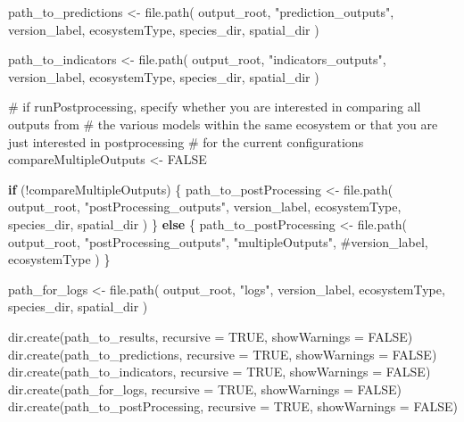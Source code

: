 \documentclass[
  letterpaper,
  DIV=11,
  numbers=noendperiod]{scrartcl}
\newenvironment{Shaded}{\begin{snugshade}}{\end{snugshade}}
\newcommand{\AttributeTok}[1]{\textcolor[rgb]{0.40,0.45,0.13}{#1}}
\newcommand{\CommentTok}[1]{\textcolor[rgb]{0.37,0.37,0.37}{#1}}
\newcommand{\ConstantTok}[1]{\textcolor[rgb]{0.56,0.35,0.01}{#1}}
\newcommand{\ControlFlowTok}[1]{\textcolor[rgb]{0.00,0.23,0.31}{\textbf{#1}}}
\newcommand{\FunctionTok}[1]{\textcolor[rgb]{0.28,0.35,0.67}{#1}}
\newcommand{\NormalTok}[1]{\textcolor[rgb]{0.00,0.23,0.31}{#1}}
\newcommand{\OtherTok}[1]{\textcolor[rgb]{0.00,0.23,0.31}{#1}}
\newcommand{\SpecialCharTok}[1]{\textcolor[rgb]{0.37,0.37,0.37}{#1}}
\newcommand{\StringTok}[1]{\textcolor[rgb]{0.13,0.47,0.30}{#1}}
\begin{document}
\begin{Shaded}
\begin{Highlighting}[]
\NormalTok{path\_to\_predictions }\OtherTok{\textless{}{-}} \FunctionTok{file.path}\NormalTok{(}
\NormalTok{  output\_root,}
  \StringTok{"prediction\_outputs"}\NormalTok{,}
\NormalTok{  version\_label,}
\NormalTok{  ecosystemType,}
\NormalTok{  species\_dir,}
\NormalTok{  spatial\_dir}
\NormalTok{)}

\NormalTok{path\_to\_indicators }\OtherTok{\textless{}{-}} \FunctionTok{file.path}\NormalTok{(}
\NormalTok{  output\_root,}
  \StringTok{"indicators\_outputs"}\NormalTok{,}
\NormalTok{  version\_label,}
\NormalTok{  ecosystemType,}
\NormalTok{  species\_dir,}
\NormalTok{  spatial\_dir}
\NormalTok{)}

\CommentTok{\# if runPostprocessing, specify whether you are interested in comparing all outputs from}
\CommentTok{\# the various models within the same ecosystem or that you are just interested in postprocessing}
\CommentTok{\# for the current configurations}
\NormalTok{compareMultipleOutputs }\OtherTok{\textless{}{-}} \ConstantTok{FALSE}

\ControlFlowTok{if}\NormalTok{ (}\SpecialCharTok{!}\NormalTok{compareMultipleOutputs) \{}
\NormalTok{  path\_to\_postProcessing }\OtherTok{\textless{}{-}} \FunctionTok{file.path}\NormalTok{(}
\NormalTok{    output\_root,}
    \StringTok{"postProcessing\_outputs"}\NormalTok{,}
\NormalTok{    version\_label,}
\NormalTok{    ecosystemType,}
\NormalTok{    species\_dir,}
\NormalTok{    spatial\_dir}
\NormalTok{  )}
\NormalTok{\} }\ControlFlowTok{else}\NormalTok{ \{}
\NormalTok{  path\_to\_postProcessing }\OtherTok{\textless{}{-}} \FunctionTok{file.path}\NormalTok{(}
\NormalTok{    output\_root,}
    \StringTok{"postProcessing\_outputs"}\NormalTok{,}
    \StringTok{"multipleOutputs"}\NormalTok{,}
    \CommentTok{\#version\_label,}
\NormalTok{    ecosystemType}
\NormalTok{  )}
\NormalTok{\}}

\NormalTok{path\_for\_logs }\OtherTok{\textless{}{-}} \FunctionTok{file.path}\NormalTok{(}
\NormalTok{  output\_root,}
  \StringTok{"logs"}\NormalTok{,}
\NormalTok{  version\_label,}
\NormalTok{  ecosystemType,}
\NormalTok{  species\_dir,}
\NormalTok{  spatial\_dir}
\NormalTok{)}

\FunctionTok{dir.create}\NormalTok{(path\_to\_results, }\AttributeTok{recursive =} \ConstantTok{TRUE}\NormalTok{, }\AttributeTok{showWarnings =} \ConstantTok{FALSE}\NormalTok{)}
\FunctionTok{dir.create}\NormalTok{(path\_to\_predictions, }\AttributeTok{recursive =} \ConstantTok{TRUE}\NormalTok{, }\AttributeTok{showWarnings =} \ConstantTok{FALSE}\NormalTok{)}
\FunctionTok{dir.create}\NormalTok{(path\_to\_indicators, }\AttributeTok{recursive =} \ConstantTok{TRUE}\NormalTok{, }\AttributeTok{showWarnings =} \ConstantTok{FALSE}\NormalTok{)}
\FunctionTok{dir.create}\NormalTok{(path\_for\_logs, }\AttributeTok{recursive =} \ConstantTok{TRUE}\NormalTok{, }\AttributeTok{showWarnings =} \ConstantTok{FALSE}\NormalTok{)}
\FunctionTok{dir.create}\NormalTok{(path\_to\_postProcessing, }\AttributeTok{recursive =} \ConstantTok{TRUE}\NormalTok{, }\AttributeTok{showWarnings =} \ConstantTok{FALSE}\NormalTok{)}
\end{Highlighting}
\end{Shaded}
\end{document}
